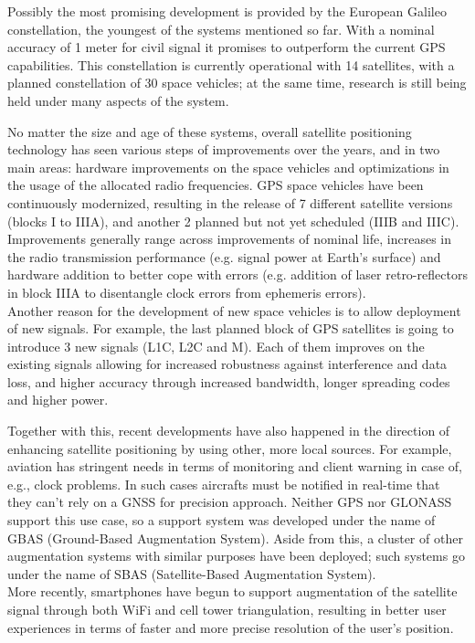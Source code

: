 Possibly the most promising development is provided by the European Galileo
constellation, the youngest of the systems mentioned so far. With a nominal
accuracy of 1 meter for civil signal it promises to outperform the current GPS
capabilities. This constellation is currently operational with 14 satellites,
with a planned constellation of 30 space vehicles; at the same time, research is
still being held under many aspects of the system.

No matter the size and age of these systems, overall satellite positioning
technology has seen various steps of improvements over the years, and in two
main areas: hardware improvements on the space vehicles and optimizations in the
usage of the allocated radio frequencies. GPS space vehicles have been
continuously modernized, resulting in the release of 7 different satellite
versions (blocks I to IIIA), and another 2 planned but not yet scheduled (IIIB
and IIIC). Improvements generally range across improvements of nominal life,
increases in the radio transmission performance (e.g. signal power at Earth's
surface) and hardware addition to better cope with errors (e.g. addition of
laser retro-reflectors in block IIIA to disentangle clock errors from ephemeris
errors). \\ 
Another reason for the development of new space vehicles is to allow
deployment of new signals. For example, the last planned block of GPS satellites
is going to introduce 3 new signals (L1C, L2C and M). Each of them improves
on the existing signals allowing for increased robustness against interference
and data loss, and higher accuracy through increased bandwidth, longer spreading
codes and higher power.

Together with this, recent developments have also happened in the direction of
enhancing satellite positioning by using other, more local sources. For example,
aviation has stringent needs in terms of monitoring and client warning in case
of, e.g., clock problems. In such cases aircrafts must be notified in real-time
that they can't rely on a GNSS for precision approach. Neither GPS nor GLONASS
support this use case, so a support system was developed under the name of GBAS
(Ground-Based Augmentation System). Aside from this, a cluster of other
augmentation systems with similar purposes have been deployed; such systems go
under the name of SBAS (Satellite-Based Augmentation System).\\
More recently, smartphones have begun to support augmentation of the satellite
signal through both WiFi and cell tower triangulation, resulting in better user
experiences in terms of faster and more precise resolution of the user's
position.

